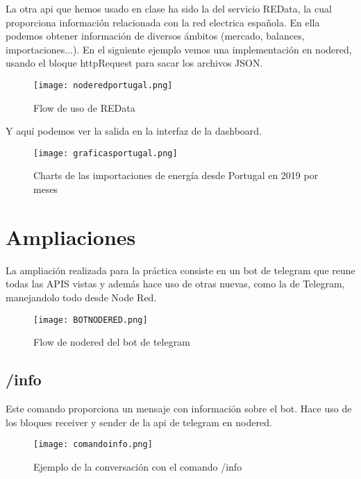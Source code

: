 \documentclass[12pt]{article}
\begin{document}
La otra api que hemos usado en clase ha sido la del servicio REData, la cual proporciona 
información relacionada con la red electrica española. En ella podemos obtener información de diversos 
ámbitos (mercado, balances, importaciones...). En el siguiente ejemplo vemos una  implementación en nodered, usando el bloque httpRequest
para sacar los archivos JSON. \\

\begin{figure}[H]
    \centering
    \texttt{[image: noderedportugal.png]}
    \caption{Flow de uso de REData}
    \label{nodeport}
\end{figure}

Y aquí podemos ver la salida en la interfaz de la dashboard.


\begin{figure}[H]
    \centering
    \texttt{[image: graficasportugal.png]}
    \caption{Charts de las importaciones de energía desde Portugal en 2019 por meses}
    \label{grafport}
\end{figure}

\section{Ampliaciones}

La ampliación realizada para la práctica consiste en un bot de telegram que reune todas las APIS vistas y además hace uso de otras nuevas, como la de Telegram, 
manejandolo todo desde Node Red. \\

\begin{figure}[H]
    \centering
    \texttt{[image: BOTNODERED.png]}
    \caption{Flow de nodered del bot de telegram}
    \label{elbot}
\end{figure}

\subsection{/info}

Este comando proporciona un mensaje con información sobre el bot. Hace uso de
los bloques receiver y sender de la api de telegram
en nodered.\\

\begin{figure}[H]
    \centering
    \texttt{[image: comandoinfo.png]}
    \caption{Ejemplo de la conversación con el comando /info}
    \label{info}
\end{figure}
\end{document}
